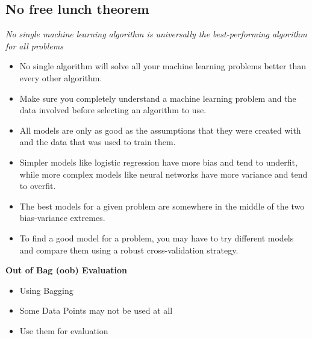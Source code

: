 \subsection{No free lunch theorem}
\textit{No single machine learning algorithm is universally the best-performing algorithm for all problems}

\begin{itemize}
    \item No single algorithm will solve all your machine learning problems better than every other algorithm.
    \item Make sure you completely understand a machine learning problem and the data involved before selecting an algorithm to use.
    \item All models are only as good as the assumptions that they were created with and the data that was used to train them.
    \item Simpler models like logistic regression have more bias and tend to underfit, while more complex models like neural networks have more variance and tend to overfit.
    \item The best models for a given problem are somewhere in the middle of the two bias-variance extremes.
    \item To find a good model for a problem, you may have to try different models and compare them using a robust cross-validation strategy.
\end{itemize}

\textbf{Out of Bag (oob) Evaluation}
\begin{itemize}
    \item Using Bagging
    \item Some Data Points may not be used at all
    \item Use them for evaluation
\end{itemize}
